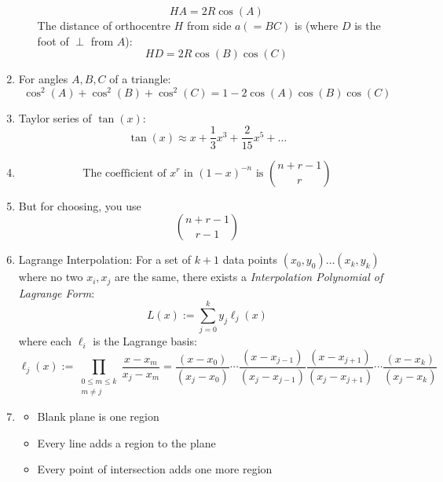 \documentclass{article}
\numberwithin{equation}{section}
\numberwithin{figure}{section}
\begin{document}
\begin{enumerate}
\begin{enumerate}
				\begin{equation}
					HA= 2R\cos(A)
				\end{equation}
			The distance of orthocentre $H$ from side $a(=BC)$ is (where $D$ is the foot of $\perp$ from $A$):
				\begin{equation}
					HD=2R\cos(B)\cos(C)
				\end{equation}
		\end{enumerate}
	\item For angles $A,B, C$ of a triangle:
		\begin{equation}
			\cos^2(A)+\cos^2(B)+\cos^2(C)=1-2\cos(A)\cos(B)\cos(C)
		\end{equation}
	\item Taylor series of $\tan(x)$:\begin{equation} \tan(x)\approx x+\frac{1}{3}x^3+\frac{2}{15}x^5+\dots\end{equation}
		\item \begin{equation} \text{The coefficient of } x^r \text{ in } (1-x)^{-n} \text{ is } {{n+r-1} \choose {r}} \end{equation} 
		\item But for choosing, you use $${{n+r-1} \choose {r-1}} $$ 
		\item Lagrange Interpolation:
			For a set of $k+1$ data points $(x_0,y_0)\dots (x_k,y_k)$ where no two $x_i, x_j$ are the same, there exists a \emph{Interpolation Polynomial of Lagrange Form}:
			\begin{equation}
				L(x):=\sum_{j=0}^{k} y_j \ell_j(x)
			\end{equation}
			where each $\ell_i$ is the Lagrange basis:
			\begin{equation}
				\ell _{j}(x):=\prod _{\begin{smallmatrix}0\leq m\leq k\\m\neq j\end{smallmatrix}}{\frac {x-x_{m}}{x_{j}-x_{m}}}={\frac {(x-x_{0})}{(x_{j}-x_{0})}}\cdots {\frac {(x-x_{j-1})}{(x_{j}-x_{j-1})}}{\frac {(x-x_{j+1})}{(x_{j}-x_{j+1})}}\cdots {\frac {(x-x_{k})}{(x_{j}-x_{k})}}
			\end{equation}
		\item   \begin{itemize}
			\item	Blank plane is one region 
			\item	Every line adds a region to the plane 
			\item	Every point of intersection adds one more region

\end{itemize}
\end{enumerate}
\end{document}
